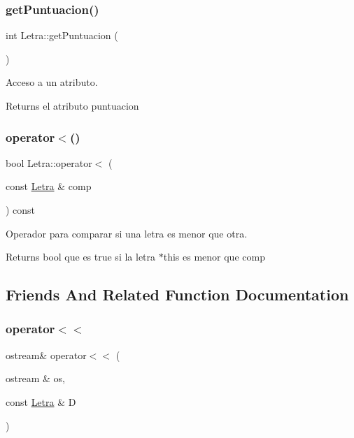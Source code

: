 \subsubsection{\texorpdfstring{getPuntuacion()}{getPuntuacion()}}
{\footnotesize\ttfamily int Letra\+::get\+Puntuacion (\begin{DoxyParamCaption}{ }\end{DoxyParamCaption})}



Acceso a un atributo. 

\begin{DoxyReturn}{Returns}
el atributo puntuacion 
\end{DoxyReturn}
\mbox{\label{classLetra_adcc529a3890dc3ee7bfef9ca1fb4124f}} 
\subsubsection{\texorpdfstring{operator$<$()}{operator<()}}
{\footnotesize\ttfamily bool Letra\+::operator$<$ (\begin{DoxyParamCaption}\item[{const \mbox{\hyperlink{classLetra}{Letra}} \&}]{comp }\end{DoxyParamCaption}) const}



Operador para comparar si una letra es menor que otra. 

\begin{DoxyReturn}{Returns}
bool que es true si la letra $\ast$this es menor que comp 
\end{DoxyReturn}


\subsection{Friends And Related Function Documentation}
\mbox{\label{classLetra_a09586a0209ffbd18eb8c0064ab38f314}} 
\subsubsection{\texorpdfstring{operator$<$$<$}{operator<<}}
{\footnotesize\ttfamily ostream\& operator$<$$<$ (\begin{DoxyParamCaption}\item[{ostream \&}]{os,  }\item[{const \mbox{\hyperlink{classLetra}{Letra}} \&}]{D }\end{DoxyParamCaption})\hspace{0.3cm}{\ttfamily [friend]}}



